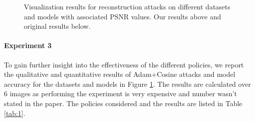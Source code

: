 \begin{figure}[h]
{        \label{fig:4cog}
    }
    \caption{Visualization results for reconstruction attacks on different datasets and models with associated PSNR values. Our results above and original results below.}
    \vspace{-5mm}
    \label{fig:4}
\end{figure}

\paragraph{Experiment 3}

To gain further insight into the effectiveness of the different policies, we report the qualitative and quantitative results of Adam+Cosine attacks and model accuracy for the datasets and models in Figure \ref{fig:4}. The results are calculated over $6$ images as performing the experiment is very expensive and number wasn't stated in the paper. The policies considered and the results are listed in Table \ref{tab:1}.


